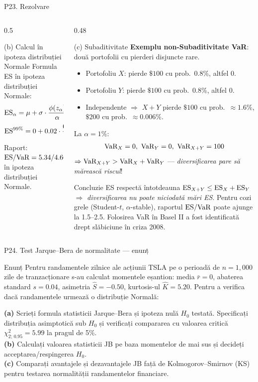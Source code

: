 \documentclass[9pt, aspectratio=169, t]{beamer}
\begin{document}
\begin{frame}[shrink=40]{P23. Rezolvare}
\begin{columns}[T]
\begin{column}{0.5\textwidth}
\begin{block}{(b) Calcul în ipoteza distribuției Normale}
Formula ES în ipoteza distribuției Normale:
\[
\text{ES}_\alpha = \mu + \sigma\cdot\frac{\phi(z_\alpha)}{\alpha}
\]
\[
\text{ES}^{99\%} = 0 + 0.02\cdot\frac{0.0267}{0.01} = 0.02\cdot 2.67 = \mathbf{0.0534 = 5.34\%}
\]
Raport: $\text{ES}/\text{VaR} = 5.34/4.66 \approx 1.15$ în ipoteza distribuției Normale.
\end{block}
\end{column}
\begin{column}{0.48\textwidth}
\begin{block}{(c) Subaditivitate}
\textbf{Exemplu non-Subaditivitate VaR}: două portofolii cu pierderi disjuncte rare.
\begin{itemize}\setlength{\itemsep}{0pt}
    \item Portofoliu $X$: pierde $\$100$ cu prob.\ 0.8\%, altfel $0$.
    \item Portofoliu $Y$: pierde $\$100$ cu prob.\ 0.8\%, altfel $0$.
    \item Independente $\Rightarrow$ $X+Y$ pierde $\$100$ cu prob.\ $\approx 1.6\%$, $\$200$ cu prob.\ $\approx 0.006\%$.
\end{itemize}
La $\alpha=1\%$:
\[
\text{VaR}_{X}=0,\ \text{VaR}_{Y}=0,\ \text{VaR}_{X+Y}=100
\]
$\Rightarrow \text{VaR}_{X+Y} > \text{VaR}_X + \text{VaR}_Y$ --- \emph{diversificarea pare să mărească riscul}!
\end{block}
\begin{alertblock}{Concluzie}
ES respectă întotdeauna $\text{ES}_{X+Y}\leq\text{ES}_X + \text{ES}_Y$ $\Rightarrow$ \emph{diversificarea nu poate niciodată mări ES}. Pentru cozi grele (Student-$t$, $\alpha$-stable), raportul $\text{ES}/\text{VaR}$ poate ajunge la 1.5--2.5. Folosirea VaR în Basel II a fost identificată drept slăbiciune în criza 2008.
\end{alertblock}
\end{column}
\end{columns}
\end{frame}

\begin{frame}{P24. Test Jarque--Bera de normalitate --- enunț}
\begin{block}{Enunț}
Pentru randamentele zilnice ale acțiunii TSLA pe o perioadă de $n=1{,}000$ zile de tranzacționare s-au calculat momentele eșantion: media $\bar r = 0$, abaterea standard $s = 0.04$, asimetria $\hat S = -0.50$, kurtosis-ul $\hat K = 5.20$. Pentru a verifica dacă randamentele urmează o distribuție Normală:

\textbf{(a)} Scrieți formula statisticii Jarque--Bera și ipoteza nulă $H_0$ testată. Specificați distribuția asimptotică sub $H_0$ și verificați compararea cu valoarea critică $\chi^2_{2;\,0.95} = 5.99$ la pragul de 5\%.\\
\textbf{(b)} Calculați valoarea statisticii JB pe baza momentelor de mai sus și decideți acceptarea/respingerea $H_0$.\\
\textbf{(c)} Comparați avantajele și dezavantajele JB față de Kolmogorov--Smirnov (KS) pentru testarea normalității randamentelor financiare.
\end{block}
\end{frame}
\end{document}
